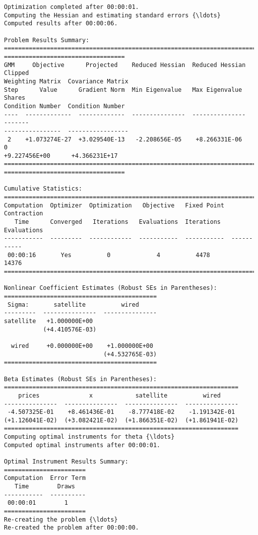 \begin{Verbatim}[commandchars=\\\{\}]
Optimization completed after 00:00:01.
Computing the Hessian and estimating standard errors {\ldots}
Computed results after 00:00:06.

Problem Results Summary:
================================================================================
==================================
GMM     Objective      Projected    Reduced Hessian  Reduced Hessian  Clipped
Weighting Matrix  Covariance Matrix
Step      Value      Gradient Norm  Min Eigenvalue   Max Eigenvalue   Shares
Condition Number  Condition Number
----  -------------  -------------  ---------------  ---------------  -------
----------------  -----------------
 2    +1.073274E-27  +3.029540E-13   -2.208656E-05    +8.266331E-06      0
+9.227456E+00      +4.366231E+17
================================================================================
==================================

Cumulative Statistics:
===========================================================================
Computation  Optimizer  Optimization   Objective   Fixed Point  Contraction
   Time      Converged   Iterations   Evaluations  Iterations   Evaluations
-----------  ---------  ------------  -----------  -----------  -----------
 00:00:16       Yes          0             4          4478         14376
===========================================================================

Nonlinear Coefficient Estimates (Robust SEs in Parentheses):
===========================================
 Sigma:       satellite          wired
---------  ---------------  ---------------
satellite   +1.000000E+00
           (+4.410576E-03)

  wired     +0.000000E+00    +1.000000E+00
                            (+4.532765E-03)
===========================================

Beta Estimates (Robust SEs in Parentheses):
==================================================================
    prices              x            satellite          wired
---------------  ---------------  ---------------  ---------------
 -4.507325E-01    +8.461436E-01    -8.777418E-02    -1.191342E-01
(+1.126041E-02)  (+3.082421E-02)  (+1.866351E-02)  (+1.861941E-02)
==================================================================
Computing optimal instruments for theta {\ldots}
Computed optimal instruments after 00:00:01.

Optimal Instrument Results Summary:
=======================
Computation  Error Term
   Time        Draws
-----------  ----------
 00:00:01        1
=======================
Re-creating the problem {\ldots}
Re-created the problem after 00:00:00.


\end{Verbatim}
